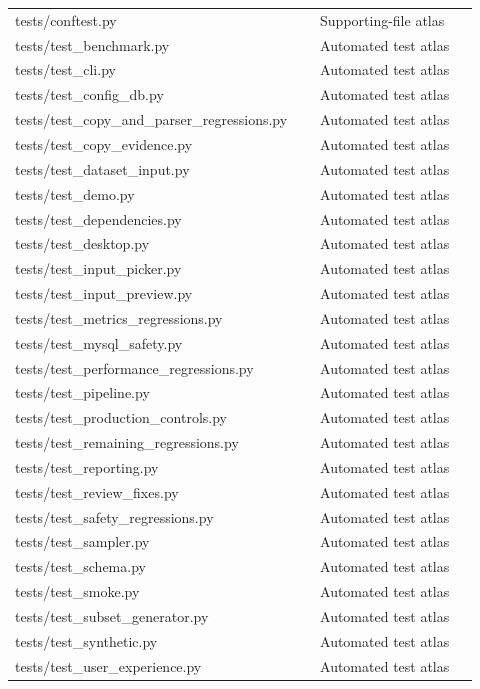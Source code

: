 \begin{longtable}{>{\raggedright\arraybackslash}p{0.598\linewidth}>{\raggedright\arraybackslash}p{0.322\linewidth}}
tests/conftest.py & Supporting-file atlas \\[4pt]
tests/test\_benchmark.py & Automated test atlas \\[4pt]
tests/test\_cli.py & Automated test atlas \\[4pt]
tests/test\_config\_db.py & Automated test atlas \\[4pt]
tests/test\_copy\_and\_parser\_regressions.py & Automated test atlas \\[4pt]
tests/test\_copy\_evidence.py & Automated test atlas \\[4pt]
tests/test\_dataset\_input.py & Automated test atlas \\[4pt]
tests/test\_demo.py & Automated test atlas \\[4pt]
tests/test\_dependencies.py & Automated test atlas \\[4pt]
tests/test\_desktop.py & Automated test atlas \\[4pt]
tests/test\_input\_picker.py & Automated test atlas \\[4pt]
tests/test\_input\_preview.py & Automated test atlas \\[4pt]
tests/test\_metrics\_regressions.py & Automated test atlas \\[4pt]
tests/test\_mysql\_safety.py & Automated test atlas \\[4pt]
tests/test\_performance\_regressions.py & Automated test atlas \\[4pt]
tests/test\_pipeline.py & Automated test atlas \\[4pt]
tests/test\_production\_controls.py & Automated test atlas \\[4pt]
tests/test\_remaining\_regressions.py & Automated test atlas \\[4pt]
tests/test\_reporting.py & Automated test atlas \\[4pt]
tests/test\_review\_fixes.py & Automated test atlas \\[4pt]
tests/test\_safety\_regressions.py & Automated test atlas \\[4pt]
tests/test\_sampler.py & Automated test atlas \\[4pt]
tests/test\_schema.py & Automated test atlas \\[4pt]
tests/test\_smoke.py & Automated test atlas \\[4pt]
tests/test\_subset\_generator.py & Automated test atlas \\[4pt]
tests/test\_synthetic.py & Automated test atlas \\[4pt]
tests/test\_user\_experience.py & Automated test atlas \\[4pt]

\end{longtable}
